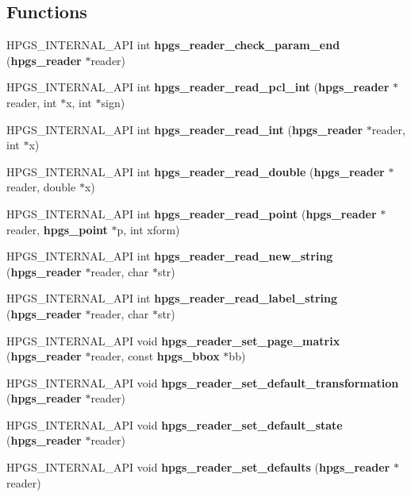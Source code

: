 \subsection*{Functions}
\begin{CompactItemize}
\item 
HPGS\_\-INTERNAL\_\-API int \textbf{hpgs\_\-reader\_\-check\_\-param\_\-end} ({\bf hpgs\_\-reader} $\ast$reader)\label{group__reader_gfd6d559ddde9821fdb9664ed9b350437}

\item 
HPGS\_\-INTERNAL\_\-API int {\bf hpgs\_\-reader\_\-read\_\-pcl\_\-int} ({\bf hpgs\_\-reader} $\ast$reader, int $\ast$x, int $\ast$sign)
\item 
HPGS\_\-INTERNAL\_\-API int {\bf hpgs\_\-reader\_\-read\_\-int} ({\bf hpgs\_\-reader} $\ast$reader, int $\ast$x)
\item 
HPGS\_\-INTERNAL\_\-API int {\bf hpgs\_\-reader\_\-read\_\-double} ({\bf hpgs\_\-reader} $\ast$reader, double $\ast$x)
\item 
HPGS\_\-INTERNAL\_\-API int \textbf{hpgs\_\-reader\_\-read\_\-point} ({\bf hpgs\_\-reader} $\ast$reader, {\bf hpgs\_\-point} $\ast$p, int xform)\label{group__reader_gf2f8dd795fe271aaa65b18b76411c74c}

\item 
HPGS\_\-INTERNAL\_\-API int {\bf hpgs\_\-reader\_\-read\_\-new\_\-string} ({\bf hpgs\_\-reader} $\ast$reader, char $\ast$str)
\item 
HPGS\_\-INTERNAL\_\-API int \textbf{hpgs\_\-reader\_\-read\_\-label\_\-string} ({\bf hpgs\_\-reader} $\ast$reader, char $\ast$str)\label{group__reader_g5f24e8cf1310c401bc7fc8881f9a0879}

\item 
HPGS\_\-INTERNAL\_\-API void \textbf{hpgs\_\-reader\_\-set\_\-page\_\-matrix} ({\bf hpgs\_\-reader} $\ast$reader, const {\bf hpgs\_\-bbox} $\ast$bb)\label{group__reader_g72c7fa4b8ac9145ebb61135d472bc9c9}

\item 
HPGS\_\-INTERNAL\_\-API void \textbf{hpgs\_\-reader\_\-set\_\-default\_\-transformation} ({\bf hpgs\_\-reader} $\ast$reader)\label{group__reader_gf1fb3505e9053168ef9115846a28fec5}

\item 
HPGS\_\-INTERNAL\_\-API void \textbf{hpgs\_\-reader\_\-set\_\-default\_\-state} ({\bf hpgs\_\-reader} $\ast$reader)\label{group__reader_gbfe55a98e961170ac6d21984de801f1b}

\item 
HPGS\_\-INTERNAL\_\-API void \textbf{hpgs\_\-reader\_\-set\_\-defaults} ({\bf hpgs\_\-reader} $\ast$reader)\label{group__reader_g82d8ec9da507f8560f50120db8f2cc05}


\end{CompactItemize}
